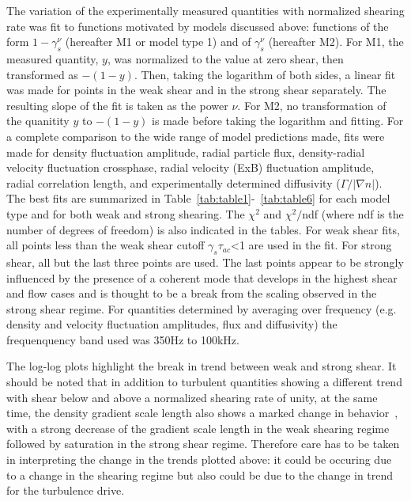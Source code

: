 \documentclass[aip,pop,amsmath,amssymb,reprint,superscriptaddress]{revtex4-1} %
\begin{document}
The variation of the experimentally measured quantities with normalized shearing rate  was fit to functions motivated by models discussed above: functions of the form $1-\gamma_{s}^{\nu}$ (hereafter M1 or model type 1) and of $\gamma_{s}^{\nu}$ (hereafter M2). For M1, the measured quantity, $y$, was normalized to the value at zero shear, then transformed as $-(1-y)$. Then, taking the logarithm of both sides, a linear fit was made for points in the weak shear and in the strong shear separately. The resulting slope of the fit is taken as the power $\nu$. For M2, no transformation of the quanitity $y$ to $-(1-y)$ is made before taking the logarithm and fitting. For a complete comparison to the wide range of model predictions made, fits were made for density fluctuation amplitude, radial particle flux, density-radial velocity fluctuation crossphase, radial velocity (ExB) fluctuation amplitude, radial correlation length, and experimentally determined diffusivity ($\Gamma/|\nabla n|$). The best fits are summarized in Table~\ref{tab:table1}-~\ref{tab:table6} for each model type and for both weak and strong shearing. The $\chi^{2}$ and $\chi^{2}/$ndf (where ndf is the number of degrees of freedom) is also indicated in the tables.  For weak shear fits, all points less than the weak shear cutoff $\gamma_{s}\tau_{ac}$<1 are used in the fit. For strong shear, all but the last three points are used. The last points appear to be strongly influenced by the presence of a coherent mode that develops in the highest shear and flow cases and is thought to be a break from the scaling observed in the strong shear regime. For quantities determined by averaging over frequency (e.g. density and velocity fluctuation amplitudes, flux and diffusivity) the frequenquency band used was 350Hz to 100kHz.

The log-log plots highlight the break in trend between weak and strong shear. It should be noted that in addition to turbulent quantities showing a different trend with shear below and above a normalized shearing rate of unity, at the same time, the density gradient scale length also shows a marked change in behavior~\cite{schaffner12}, with a strong decrease of the gradient scale length in the weak shearing regime followed by saturation in the strong shear regime. Therefore care has to be taken in interpreting the change in the trends plotted above: it could be occuring due to a change in the shearing regime but also could be due to the change in trend for the turbulence drive.
\end{document}
